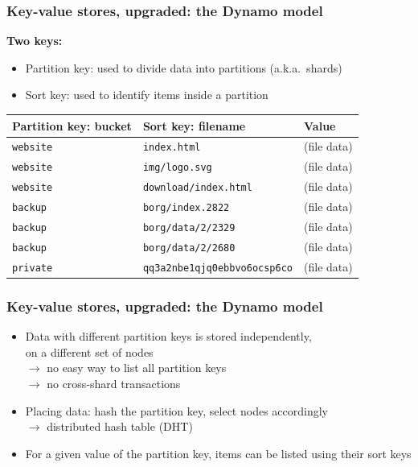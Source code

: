 \documentclass[aspectratio=169]{beamer}
\begin{document}
\begin{frame}
	\frametitle{Key-value stores, upgraded: the Dynamo model}
	\textbf{Two keys:}
	\begin{itemize}
		\item Partition key: used to divide data into partitions {\small (a.k.a.~shards)}
		\item Sort key: used to identify items inside a partition
	\end{itemize}

	\vspace{1em}

	\begin{center}
	\begin{tabular}{|l|l|p{3cm}|}
		\hline
		\textbf{Partition key: bucket} & \textbf{Sort key: filename} & \textbf{Value} \\
		\hline
		\hline
		\texttt{website} & \texttt{index.html} & (file data) \\
		\hline
		\texttt{website} & \texttt{img/logo.svg} & (file data) \\
		\hline
		\texttt{website} & \texttt{download/index.html} & (file data) \\
		\hline
		\hline
		\texttt{backup} & \texttt{borg/index.2822} & (file data) \\
		\hline
		\texttt{backup} & \texttt{borg/data/2/2329} & (file data) \\
		\hline
		\texttt{backup} & \texttt{borg/data/2/2680} & (file data) \\
		\hline
		\hline
		\texttt{private} & \texttt{qq3a2nbe1qjq0ebbvo6ocsp6co} & (file data) \\
		\hline
	\end{tabular}
	\end{center}
\end{frame}

\begin{frame}
	\frametitle{Key-value stores, upgraded: the Dynamo model}
	\begin{itemize}
		\item Data with different partition keys is stored independently,\\
			on a different set of nodes\\
			\vspace{.5em}
			$\to$ no easy way to list all partition keys\\
			$\to$ no cross-shard transactions\\
			\vspace{2em}
		\item Placing data: hash the partition key, select nodes accordingly\\
			\vspace{.5em}
			$\to$ distributed hash table (DHT)
			\vspace{2em}
		\item For a given value of the partition key, items can be listed using their sort keys
	\end{itemize}
\end{frame}
\end{document}
